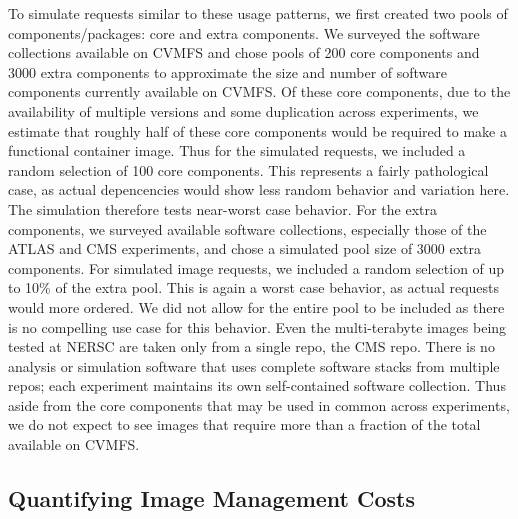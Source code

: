 \documentclass[conference]{IEEEtran}
\begin{document}
To simulate requests similar to these usage patterns,
we first created two pools of components/packages: core and extra components.
We surveyed the software collections available on CVMFS and chose pools of 200 core components and 3000 extra components to approximate the size and number of software components currently available on CVMFS.
Of these core components,
due to the availability of multiple versions and some duplication across experiments,
we estimate that roughly half of these core components would be required to make a functional container image.
Thus for the simulated requests,
we included a random selection of 100 core components.
This represents a fairly pathological case,
as actual depencencies would show less random behavior and variation here.
The simulation therefore tests near-worst case behavior.
For the extra components,
we surveyed available software collections,
especially those of the ATLAS and CMS experiments,
and chose a simulated pool size of 3000 extra components.
For simulated image requests,
we included a random selection of up to 10\% of the extra pool.
This is again a worst case behavior,
as actual requests would more ordered.
We did not allow for the entire pool to be included as there is no compelling use case for this behavior.
Even the multi-terabyte images being tested at NERSC are taken only from a single repo,
the CMS repo.
There is no analysis or simulation software that uses complete software stacks from multiple repos;
each experiment maintains its own self-contained software collection.
Thus aside from the core components that may be used in common across experiments,
we do not expect to see images that require more than a fraction of the total available on CVMFS.

\subsection{Quantifying Image Management Costs}
\end{document}
